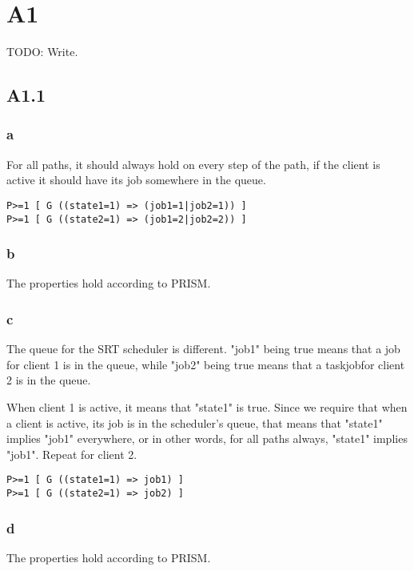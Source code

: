 
\section{A1}

TODO: Write.

\subsection{A1.1}

\subsubsection{a}

For all paths, it should always hold on every step of the path,
if the client is active it should have its job somewhere in the queue.

\begin{verbatim}
P>=1 [ G ((state1=1) => (job1=1|job2=1)) ]
P>=1 [ G ((state2=1) => (job1=2|job2=2)) ]
\end{verbatim}

\subsubsection{b}

The properties hold according to PRISM.

\subsubsection{c}

The queue for the SRT scheduler is different.
"job1" being true means that a job for
client 1 is in the queue,
while "job2" being true means that a taskjobfor
client 2 is in the queue.

When client 1 is active,
it means that "state1" is true.
Since we require that when a client is active,
its job is in the scheduler's queue,
that means that "state1" implies "job1"
everywhere, or in other words, for all paths
always, "state1" implies "job1".
Repeat for client 2.

\begin{verbatim}
P>=1 [ G ((state1=1) => job1) ]
P>=1 [ G ((state2=1) => job2) ]
\end{verbatim}

\subsubsection{d}

The properties hold according to PRISM.

